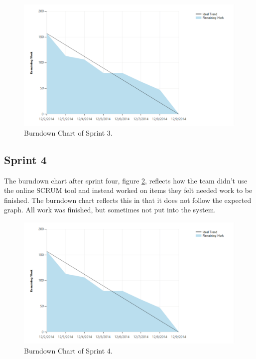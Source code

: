 \begin{figure}[H]
	\centering
	\includegraphics[width=\textwidth]{Figures/Burndown3}
	\caption{Burndown Chart of Sprint 3.}
	\label{fig:burndown3}
\end{figure}

\subsection{Sprint 4}
The burndown chart after sprint four, figure \ref{fig:burndown4}, reflects how the team didn't use the online SCRUM tool and instead worked on items they felt needed work to be finished. The burndown chart reflects this in that it does not follow the expected graph. All work was finished, but sometimes not put into the system. \\

\begin{figure}[H]
	\centering
	\includegraphics[width=\textwidth]{Figures/Burndown3}
	\caption{Burndown Chart of Sprint 4.}
	\label{fig:burndown4}
\end{figure}
